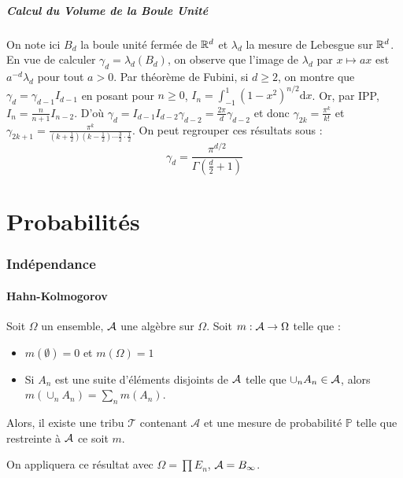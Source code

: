 \documentclass{cours}
\begin{document}
        \subsubsection{Calcul du Volume de la Boule Unité}
        On note ici $B_{d}$ la boule unité fermée de $\mathbb{R}^{d}$ et $\lambda_{d}$ la mesure de Lebesgue sur $\mathbb{R}^{d}$. En vue de calculer $\gamma_{d} = \lambda_{d}\left(B_{d}\right)$, on observe que l'image de $\lambda_{d}$ par $x \mapsto ax$ est $a^{-d}\lambda_{d}$ pour tout $a > 0$.
        Par théorème de Fubini, si $d \geq 2$, on montre que $\gamma_{d} = \gamma_{d-1} I_{d-1}$ en posant pour $n \geq 0$, $I_{n} = \int_{-1}^{1}\left(1 - x^{2}\right)^{n/2}\mathrm{d}x$.
        Or, par IPP, $I_{n} = \frac{n}{n + 1}I_{n-2}$. D'où $\gamma_{d} = I_{d-1}I_{d-2}\gamma_{d-2} = \frac{2\pi}{d}\gamma_{d-2}$ et donc $\gamma_{2k} = \frac{\pi^{k}}{k!}$ et $\gamma_{2k+1} = \frac{\pi^{k}}{\left(k + \frac{1}{2}\right)\left(k - \frac{1}{2}\right)\cdots \frac{3}{2}\cdot\frac{1}{2}}$.
        On peut regrouper ces résultats sous : 
        \[
            \gamma_{d} = \frac{\pi^{d/2}}{\Gamma\left(\frac{d}{2} + 1\right)}
        \]
        


    \part{Probabilités}

    \section{Indépendance}
        \subsection{Hahn-Kolmogorov}
            \begin{theorem}
                Soit $\Omega$ un ensemble, $\mathcal{A}$ une algèbre sur $\Omega$.
                Soit $m : \mathcal{A} \rightarrow \Omega$ telle que : 
                \begin{itemize}
                    \item $m(\emptyset) = 0$ et $m(\Omega) = 1$
                    \item Si $A_{n}$ est une suite d'éléments disjoints de $\mathcal{A}$ telle que $\cup_{n} A_{n} \in \mathcal{A}$, alors $m\left(\cup_{n} A_{n}\right) = \sum_{n} m(A_{n})$.
                \end{itemize}
                Alors, il existe une tribu $\mathcal{T}$ contenant $\mathcal{A}$ et une mesure de probabilité $\mathbb{P}$ telle que restreinte à $\mathcal{A}$ ce soit $m$.
            \end{theorem}
            \begin{remark}
                On appliquera ce résultat avec $\Omega = \prod E_{n}$, $\mathcal{A} = B_{\infty}$.
            \end{remark}
\end{document}
